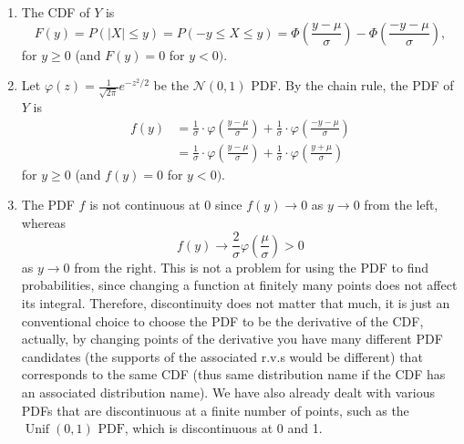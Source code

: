 

\setcounter{theorem}{28}
\begin{exercise}[BH.5.29]
\begin{solution}
    \begin{enumerate}
        \item The CDF of $Y$ is
        $$
        F(y)=P(|X| \leq y)=P(-y \leq X \leq y)=\Phi\left(\frac{y-\mu}{\sigma}\right)-\Phi\left(\frac{-y-\mu}{\sigma}\right),
        $$
        for $y \geq 0$ (and $F(y)=0$ for $y<0)$.
        \item Let $\varphi(z)=\frac{1}{\sqrt{2 \pi}} e^{-z^2 / 2}$ be the $\mathcal{N}(0,1)$ PDF. By the chain rule, the PDF of $Y$ is
        $$
        \begin{aligned}
            f(y) &=\frac{1}{\sigma} \cdot \varphi\left(\frac{y-\mu}{\sigma}\right)+\frac{1}{\sigma} \cdot \varphi\left(\frac{-y-\mu}{\sigma}\right) \\
            &=\frac{1}{\sigma} \cdot \varphi\left(\frac{y-\mu}{\sigma}\right)+\frac{1}{\sigma} \cdot \varphi\left(\frac{y+\mu}{\sigma}\right)
        \end{aligned}
        $$
        for $y \geq 0$ (and $f(y)=0$ for $y<0)$.
        \item  The PDF $f$ is not continuous at 0 since $f(y) \rightarrow 0$ as $y \rightarrow 0$ from the left, whereas
        $$
        f(y) \rightarrow \frac{2}{\sigma} \varphi\left(\frac{\mu}{\sigma}\right)>0
        $$
        as $y \rightarrow 0$ from the right. This is not a problem for using the PDF to find probabilities, since changing a function at finitely many points does not affect its integral. Therefore, discontinuity does not matter that much, it is just an conventional choice to choose the PDF to be the derivative of the CDF, actually, by changing points of the derivative you have many different PDF candidates (the supports of the associated r.v.s would be different) that corresponds to the same CDF (thus same distribution name if the CDF has an associated distribution name). We have also already dealt with various PDFs that are discontinuous at a finite number of points, such as the $\operatorname{Unif}(0,1)$ $\mathrm{PDF}$, which is discontinuous at 0 and 1.
    \end{enumerate}
\end{solution}
\end{exercise}


